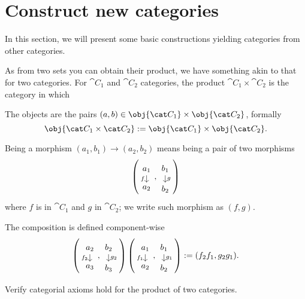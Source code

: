 
\section{Construct new categories}

In this section, we will present some basic constructions yielding
categories from other categories.

As from two sets you can obtain their product, we have something akin
to that for two categories. For \(\cat C_1\) and \(\cat C_2\)
categories, the product \(\cat C_1 \times \cat C_2\) is the category in
which
\begin{tcbitem}
\item The objects are the pairs
  \((a, b) \in \obj{\cat C_1} \times \obj{\cat C_2}\), formally
  \[\obj{\cat C_1 \times \cat C_2} := \obj{\cat C_1} \times \obj{\cat C_2}.\]
\item Being a morphism \((a_1, b_1) \to (a_2, b_2)\) means being a pair
  of two morphisms
  \[\left(\begin{tikzcd}[row sep=small] a_1 \ar["f", d, swap] \\
        a_2 \end{tikzcd}, \begin{tikzcd}[row sep=small] b_1 \ar["g",
        d] \\ b_2 \end{tikzcd}\right)\] where \(f\) is in \(\cat C_1\)
  and \(g\) in \(\cat C_2\); we write such morphism as
  \(\left(f, g\right)\).
\item The composition is defined component-wise
  \[\left(\begin{tikzcd}[row sep=small] a_2 \ar["f_2", d, swap] \\
        a_3 \end{tikzcd}, \begin{tikzcd}[row sep=small] b_2 \ar["g_2",
        d] \\ b_3 \end{tikzcd}\right) \left(\begin{tikzcd}[row
        sep=small] a_1 \ar["f_1", d, swap] \\
        a_2 \end{tikzcd}, \begin{tikzcd}[row sep=small] b_1 \ar["g_1",
        d] \\ b_2 \end{tikzcd}\right) := (f_2 f_1, g_2 g_1) .\]
\end{tcbitem}

\begin{exercise}
  Verify categorial axioms hold for the product of two categories.
\end{exercise}

